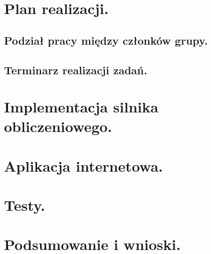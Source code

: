 \documentclass[a4paper,12pt]{article}		%
\begin{document}
\section{Plan realizacji.}
\subsection{Podział pracy między członków grupy.}
\subsection{Terminarz realizacji zadań.}
\section{Implementacja silnika obliczeniowego.}
\section{Aplikacja internetowa.}
\section{Testy.}
\section{Podsumowanie i wnioski.}
\end{document}
